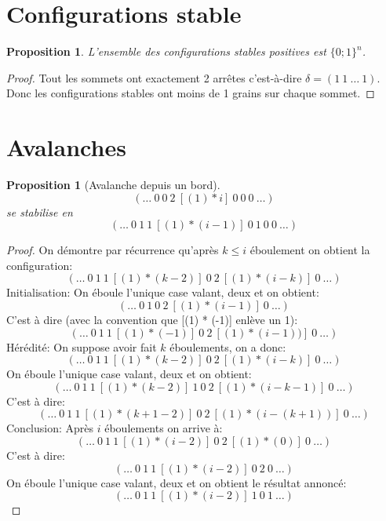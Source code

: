 \documentclass{report}
\newtheorem{property}[theorem]{Proposition}
\begin{document}
\section{Configurations stable}

\begin{property}
L'ensemble des configurations stables positives est $\{0; 1\}^{n}$.
\end{property}
\begin{proof}
Tout les sommets ont exactement 2 arrêtes c'est-à-dire $\delta = (1\ 1\ \hdots \ 1)$. Donc les configurations stables ont moins de 1 grains sur chaque sommet.
\end{proof}

\section{Avalanches}

\begin{property}[Avalanche depuis un bord]\label{ava_bord}
$$(\hdots \ 0 \ 0\ 2\ [(1) * i]\ 0\ 0\ 0\ \hdots)$$ se stabilise en $$(\hdots \ 0 \ 1\ 1\ [(1) * (i - 1)]\ 0\ 1\ 0\ 0\ \hdots)$$
\end{property}
\begin{proof}
On démontre par récurrence qu'après $k \leq i$ éboulement on obtient la configuration: $$(\hdots \ 0 \ 1\ 1\ [(1) * (k-2)]\ 0\ 2\ [(1) * (i - k)]\ 0\ \hdots)$$
Initialisation:
On éboule l'unique case valant, deux et on obtient:
$$(\hdots \ 0 \ 1\ 0\ 2\ [(1) * (i - 1)]\ 0\ \hdots)$$
C'est à dire (avec la convention que [(1) * (-1)] enlève un 1):
$$(\hdots \ 0 \ 1\ 1\ [(1) * (-1)]\ 0\ 2\ [(1) * (i - 1))]\ 0\ \hdots)$$
Hérédité:
On suppose avoir fait $k$ éboulements, on a donc:
$$(\hdots \ 0 \ 1\ 1\ [(1) * (k-2)]\ 0\ 2\ [(1) * (i - k)]\ 0\ \hdots)$$
On éboule l'unique case valant, deux et on obtient:
$$(\hdots \ 0 \ 1\ 1\ [(1) * (k-2)]\ 1\ 0\ 2\ [(1) * (i - k - 1)]\ 0\ \hdots)$$
C'est à dire:
$$(\hdots \ 0 \ 1\ 1\ [(1) * (k+1-2)]\ 0\ 2\ [(1) * (i - (k+1))]\ 0\ \hdots)$$
Conclusion:
Après $i$ éboulements on arrive à:
$$(\hdots \ 0 \ 1\ 1\ [(1) * (i-2)]\ 0\ 2\ [(1) * (0)]\ 0\ \hdots)$$
C'est à dire:
$$(\hdots \ 0 \ 1\ 1\ [(1) * (i-2)]\ 0\ 2\ 0\ \hdots)$$
On éboule l'unique case valant, deux et on obtient le résultat annoncé:
$$(\hdots \ 0 \ 1\ 1\ [(1) * (i-2)]\ 1\ 0\ 1\ \hdots)$$
\end{proof}
\end{document}
